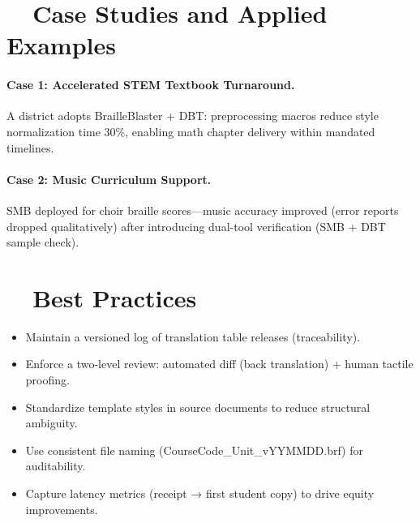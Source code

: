 \section{~~Case Studies and Applied Examples}\label{ch12:sec:case-studies}
\paragraph{Case 1: Accelerated STEM Textbook Turnaround.} A district adopts BrailleBlaster + DBT: preprocessing macros reduce style normalization time 30\%, enabling math chapter delivery within mandated timelines.
\paragraph{Case 2: Music Curriculum Support.} SMB deployed for choir braille scores—music accuracy improved (error reports dropped qualitatively) after introducing dual-tool verification (SMB + DBT sample check).

\section{~~Best Practices}\label{ch12:sec:best-practices}
\begin{itemize}
	\item Maintain a versioned log of translation table releases (traceability).
	\item Enforce a two-level review: automated diff (back translation) + human tactile proofing.
	\item Standardize template styles in source documents to reduce structural ambiguity.
	\item Use consistent file naming (CourseCode\_Unit\_vYYMMDD.brf) for auditability.
	\item Capture latency metrics (receipt → first student copy) to drive equity improvements.
\end{itemize}

